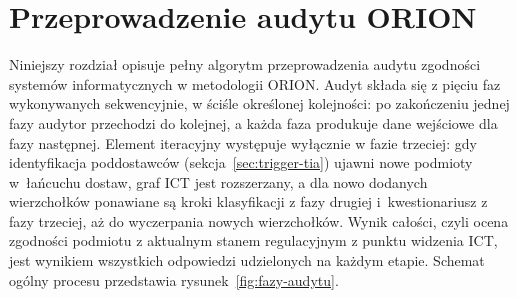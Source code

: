 \makeatletter
\newcommand{\zakres@znacznik}[1]{%
  \edef\zakres@test{\noexpand\in@{#1}{\zakres@wartosc}}\zakres@test
  \ifin@\fbox{\scriptsize\bfseries #1}\else{\scriptsize\color{gray}\,#1\,}\fi}
\newcommand{\zakresRegulacyjny}[1]{%
  \edef\zakres@wartosc{#1}%
  \zakres@znacznik{DORA}\enspace\zakres@znacznik{NIS2}\enspace\zakres@znacznik{RODO}%
  \edef\zakres@test{\noexpand\in@{brak}{\zakres@wartosc}}\zakres@test
  \ifin@\enspace{\small(dobra praktyka)}\fi}
\makeatother

\newcommand{\generujKryteria}[2]{%
\vspace{0.5cm}\\
Pytania w sekcji:\\\\
  \csvreader[
    separator=semicolon,
    no head
  ]{#1}{}{%
    \ifcsvstrcmp{\csvcoli}{#2}{%
      \noindent
      Obszar: \textbf{\csvcolii} \\
      Podstawa prawna: \textbf{\csvcoliii} \\
      Zakres regulacyjny: \zakresRegulacyjny{\csvcolx} \\
      Typ pytania: \textbf{\csvcolviii}, blokujące: \textbf{\csvcolix}

      \begin{itemize}
        \item \textbf{Perspektywa zgodności:} \csvcoliv
        \item \textbf{Perspektywa użytkownika:} \csvcolvi
        \item \textbf{Perspektywa techniczna:} \csvcolv
      \end{itemize}
    }{}%
  }
}

\chapter{Przeprowadzenie audytu ORION}
\label{chap:audyt}

Niniejszy rozdział opisuje pełny algorytm przeprowadzenia audytu zgodności systemów informatycznych w metodologii ORION.
Audyt składa się z pięciu faz wykonywanych sekwencyjnie, w ściśle określonej kolejności: po zakończeniu jednej fazy audytor przechodzi do kolejnej, a każda faza produkuje dane wejściowe dla fazy następnej.
Element iteracyjny występuje wyłącznie w fazie trzeciej: gdy identyfikacja poddostawców (sekcja~\ref{sec:trigger-tia}) ujawni nowe podmioty w~łańcuchu dostaw, graf ICT jest rozszerzany, a dla nowo dodanych wierzchołków ponawiane są kroki klasyfikacji z fazy drugiej i~kwestionariusz z fazy trzeciej, aż do wyczerpania nowych wierzchołków.
Wynik całości, czyli ocena zgodności podmiotu z aktualnym stanem regulacyjnym z punktu widzenia ICT, jest wynikiem wszystkich odpowiedzi udzielonych na każdym etapie.
Schemat ogólny procesu przedstawia rysunek~\ref{fig:fazy-audytu}.

